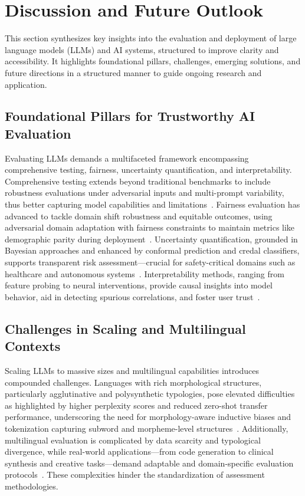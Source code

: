\documentclass[sigconf]{acmart}
\begin{document}
\section{Discussion and Future Outlook}

This section synthesizes key insights into the evaluation and deployment of large language models (LLMs) and AI systems, structured to improve clarity and accessibility. It highlights foundational pillars, challenges, emerging solutions, and future directions in a structured manner to guide ongoing research and application.

\subsection{Foundational Pillars for Trustworthy AI Evaluation}

Evaluating LLMs demands a multifaceted framework encompassing comprehensive testing, fairness, uncertainty quantification, and interpretability. Comprehensive testing extends beyond traditional benchmarks to include robustness evaluations under adversarial inputs and multi-prompt variability, thus better capturing model capabilities and limitations~\cite{ref25}. Fairness evaluation has advanced to tackle domain shift robustness and equitable outcomes, using adversarial domain adaptation with fairness constraints to maintain metrics like demographic parity during deployment~\cite{ref41}. Uncertainty quantification, grounded in Bayesian approaches and enhanced by conformal prediction and credal classifiers, supports transparent risk assessment—crucial for safety-critical domains such as healthcare and autonomous systems~\cite{ref35}. Interpretability methods, ranging from feature probing to neural interventions, provide causal insights into model behavior, aid in detecting spurious correlations, and foster user trust~\cite{ref36}.

\subsection{Challenges in Scaling and Multilingual Contexts}

Scaling LLMs to massive sizes and multilingual capabilities introduces compounded challenges. Languages with rich morphological structures, particularly agglutinative and polysynthetic typologies, pose elevated difficulties as highlighted by higher perplexity scores and reduced zero-shot transfer performance, underscoring the need for morphology-aware inductive biases and tokenization capturing subword and morpheme-level structures~\cite{ref38}. Additionally, multilingual evaluation is complicated by data scarcity and typological divergence, while real-world applications—from code generation to clinical synthesis and creative tasks—demand adaptable and domain-specific evaluation protocols~\cite{ref12,ref15,ref31}. These complexities hinder the standardization of assessment methodologies.
\end{document}
